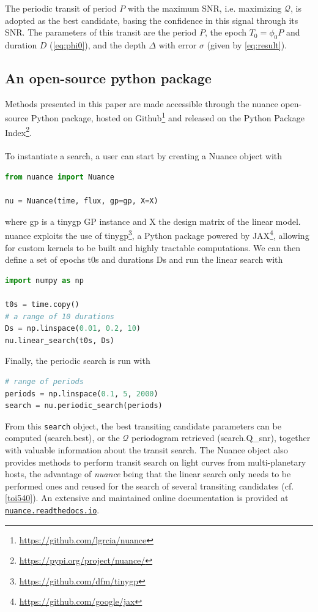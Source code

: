 \documentclass[modern]{aastex631}
\newcommand{\nuancemethod}{\textit{nuance}}
\newcommand{\nuancecode}{\textsf{nuance}}
\newcommand{\footlink}[1]{\footnote{\url{#1}}}
\begin{document}
The periodic transit of period $P$ with the maximum SNR, i.e. maximizing $\mathcal{Q}$, is adopted as the best candidate, basing the confidence in this signal through its SNR. The parameters of this transit are the period $P$, the epoch $T_0 = \phi_0 P$ and duration $D$ (\autoref{eq:phi0}), and the depth $\Delta$ with error $\sigma$ (given by \autoref{eq:result}).

\subsection{An open-source python package}\label{package}
Methods presented in this paper are made accessible through the \nuancecode{} open-source Python package, hosted on Github\footnote{\href{https://github.com/lgrcia/nuance}{https://github.com/lgrcia/nuance}} and released on the Python Package Index\footlink{https://pypi.org/project/nuance/}. 
\\\\
To instantiate a search, a user can start by creating a \textsf{Nuance} object with
\begin{lstlisting}[language=Python]
from nuance import Nuance

nu = Nuance(time, flux, gp=gp, X=X)
\end{lstlisting}
where \textsf{gp} is a \textsf{tinygp} GP instance and \textsf{X} the design matrix of the linear model. \textsf{nuance} exploits the use of \textsf{tinygp}\footnote{\href{https://github.com/dfm/tinygp}{https://github.com/dfm/tinygp}}, a Python package powered by \textsf{JAX}\footnote{\href{https://github.com/google/jax}{https://github.com/google/jax}}, allowing for custom kernels to be built and highly tractable computations. We can then define a set of epochs \textsf{t0s} and durations \textsf{Ds} and run the linear search with
\begin{lstlisting}[language=Python,linewidth=\linewidth]
import numpy as np

t0s = time.copy()
# a range of 10 durations
Ds = np.linspace(0.01, 0.2, 10)
nu.linear_search(t0s, Ds)
\end{lstlisting}
Finally, the periodic search is run with
\begin{lstlisting}[language=Python]
# range of periods
periods = np.linspace(0.1, 5, 2000)
search = nu.periodic_search(periods)
\end{lstlisting}
From this \texttt{search} object, the best transiting candidate parameters can be computed (\textsf{search.best}), or the $\mathcal{Q}$ periodogram retrieved (\textsf{search.Q\_snr}), together with valuable information about the transit search. The \textsf{Nuance} object also provides methods to perform transit search on light curves from multi-planetary hosts, the advantage of \nuancemethod{} being that the linear search only needs to be performed ones and reused for the search of several transiting candidates (cf.\;\autoref{toi540}). An extensive and maintained online documentation is provided at \href{https://nuance.readthedocs.io}{\texttt{nuance.readthedocs.io}}.
\end{document}
